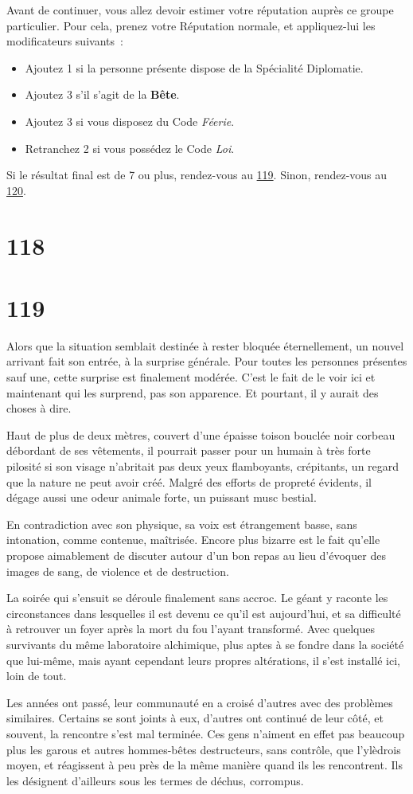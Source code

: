 \documentclass{report}
\newcommand{\gsection}[1]{
    \section{#1}
    \label{section-#1}
}
\newcommand{\glink}[1]{\hyperref[section-#1]{#1}}
\newcommand{\hero}[1]{\textbf{#1}}
\begin{document}
Avant de continuer, vous allez devoir estimer votre réputation auprès ce groupe particulier. Pour cela, prenez votre Réputation normale, et appliquez-lui les modificateurs suivants :
\begin{itemize}
\item Ajoutez 1 si la personne présente dispose de la Spécialité Diplomatie.
\item Ajoutez 3 s'il s'agit de la \hero{Bête}.
\item Ajoutez 3 si vous disposez du Code \emph{Féerie}.
\item Retranchez 2 si vous possédez le Code \emph{Loi}.
\end{itemize}

Si le résultat final est de 7 ou plus, rendez-vous au \glink{119}. Sinon, rendez-vous au \glink{120}.

\gsection{118}

\gsection{119}

Alors que la situation semblait destinée à rester bloquée éternellement, un nouvel arrivant fait son entrée, à la surprise générale. Pour toutes les personnes présentes sauf une, cette surprise est finalement modérée. C'est le fait de le voir ici et maintenant qui les surprend, pas son apparence. Et pourtant, il y aurait des choses à dire.

Haut de plus de deux mètres, couvert d'une épaisse toison bouclée noir corbeau débordant de ses vêtements, il pourrait passer pour un humain à très forte pilosité si son visage n'abritait pas deux yeux flamboyants, crépitants, un regard que la nature ne peut avoir créé. Malgré des efforts de propreté évidents, il dégage aussi une odeur animale forte, un puissant musc bestial.

En contradiction avec son physique, sa voix est étrangement basse, sans intonation, comme contenue, maîtrisée. Encore plus bizarre est le fait qu'elle propose aimablement de discuter autour d'un bon repas au lieu d'évoquer des images de sang, de violence et de destruction.

La soirée qui s'ensuit se déroule finalement sans accroc. Le géant y raconte les circonstances dans lesquelles il est devenu ce qu'il est aujourd'hui, et sa difficulté à retrouver un foyer après la mort du fou l'ayant transformé. Avec quelques survivants du même laboratoire alchimique, plus aptes à se fondre dans la société que lui-même, mais ayant cependant leurs propres altérations, il s'est installé ici, loin de tout.

Les années ont passé, leur communauté en a croisé d'autres avec des problèmes similaires. Certains se sont joints à eux, d'autres ont continué de leur côté, et souvent, la rencontre s'est mal terminée. Ces gens n'aiment en effet pas beaucoup plus les garous et autres hommes-bêtes destructeurs, sans contrôle, que l'ylèdrois moyen, et réagissent à peu près de la même manière quand ils les rencontrent. Ils les désignent d'ailleurs sous les termes de déchus, corrompus.
\end{document}
